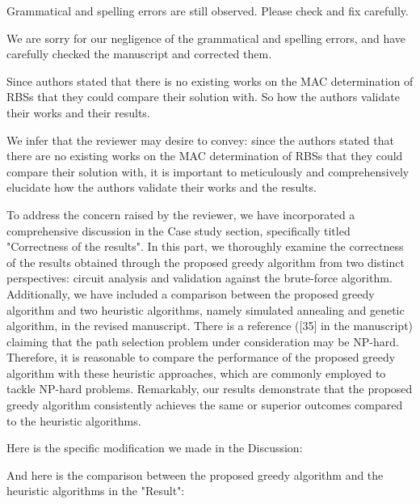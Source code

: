 \reviewer
\begin{revcomment}
  Grammatical and spelling errors are still observed. Please check and fix carefully.
\end{revcomment}
\begin{revresponse}

We are sorry for our negligence of the grammatical and spelling errors, and have carefully checked the manuscript and corrected them. 

\end{revresponse}

\begin{revcomment}
  Since authors stated that there is no existing works on the MAC determination of RBSs that they could compare their solution with. So how the authors validate their works and their results.
\end{revcomment}
\begin{revresponse}

We infer that the reviewer may desire to convey: since the authors stated that there are no existing works on the MAC determination of RBSs that they could compare their solution with, it is important to meticulously and comprehensively elucidate how the authors validate their works and the results.


To address the concern raised by the reviewer, we have incorporated a comprehensive discussion in the Case study section, specifically titled "Correctness of the results". 
In this part, we thoroughly examine the correctness of the results obtained through the proposed greedy algorithm from two distinct perspectives: circuit analysis and validation against the brute-force algorithm. 
Additionally, we have included a comparison between the proposed greedy algorithm and two heuristic algorithms, namely simulated annealing and genetic algorithm, in the revised manuscript. 
There is a reference ([35] in the manuscript) claiming that the path selection problem under consideration may be NP-hard.
Therefore, it is reasonable to compare the performance of the proposed greedy algorithm with these heuristic approaches, which are commonly employed to tackle NP-hard problems.
Remarkably, our results demonstrate that the proposed greedy algorithm consistently achieves the same or superior outcomes compared to the heuristic algorithms.


Here is the specific modification we made in the Discussion:
\begin{changes}
\end{changes}
And here is the comparison between the proposed greedy algorithm and the heuristic algorithms in the "Result":
\begin{changes}
\end{changes}

\end{revresponse}

